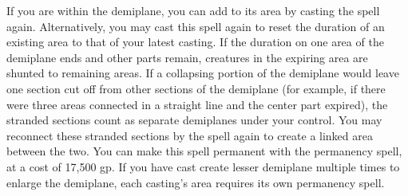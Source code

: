 {If you are within the demiplane, you can add to its area by casting the spell again. Alternatively, you may cast this spell again to reset the duration of an existing area to that of your latest casting. If the duration on one area of the demiplane ends and other parts remain, creatures in the expiring area are shunted to remaining areas. If a collapsing portion of the demiplane would leave one section cut off from other sections of the demiplane (for example, if there were three areas connected in a straight line and the center part expired), the stranded sections count as separate demiplanes under your control. You may reconnect these stranded sections by the spell again to create a linked area between the two.
You can make this spell permanent with the permanency spell, at a cost of 17,500 gp. If you have cast create lesser demiplane multiple times to enlarge the demiplane, each casting's area requires its own permanency spell.}
        
